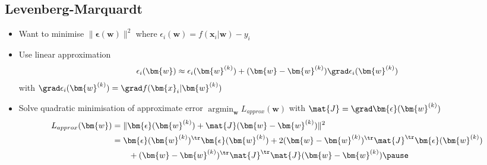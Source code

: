 \begin{slide}
\section[-2]{Levenberg-Marquardt}

\begin{PauseHighLight}
  \begin{itemize}
  \item Want to minimise $\|\bm{\epsilon}(\bm{w})\|^2$ where
    $\epsilon_i(\bm{w}) =  f(\bm{x}_i|\bm{w}) - y_i$\pause
  \item Use linear approximation
    \begin{align*}
      \epsilon_i(\bm{w}) \approx \epsilon_i(\bm{w}^{(k)}) +
      (\bm{w}-\bm{w}^{(k)}) \grad \epsilon_i(\bm{w}^{(k)})
    \end{align*}
    with $\grad \epsilon_i(\bm{w}^{(k)}) = \grad f(\bm{x}_i|\bm{w}^{(k)})$\pause
  \item Solve quadratic minimisation of approximate error
    $\mathop{\mathrm{argmin}}_{\bm{w}} 
    L_{approx}(\bm{w})$ with $\mat{J}=\grad \bm{\epsilon}(\bm{w}^{(k)})$
    \begin{align*}
      L_{approx}(\bm{w}) &= 
      \| \bm{\epsilon}(\bm{w}^{(k)}) +
      \mat{J} (\bm{w}-\bm{w}^{(k)}) \|^2 \\
      &=
      \bm{\epsilon}(\bm{w}^{(k)})^\tr\bm{\epsilon}(\bm{w}^{(k)})
      + 2 (\bm{w}-\bm{w}^{(k)})^\tr \mat{J}^\tr
      \bm{\epsilon}(\bm{w}^{(k)}) \\
      &\hspace{2em}
      + (\bm{w}-\bm{w}^{(k)})^\tr \mat{J}^\tr \mat{J} (\bm{w}-\bm{w}^{(k)})
      \pause
    \end{align*}
  \end{itemize}
\end{PauseHighLight}

\end{slide}


